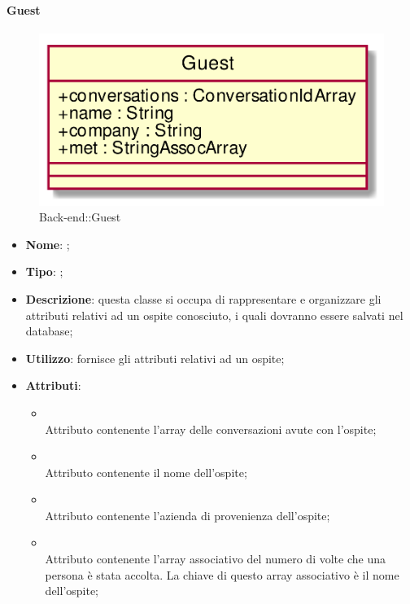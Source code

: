 \hypertarget{Guest_label}{\paragraph{Guest}}
\begin{figure}[h]
	\centering
	\includegraphics[width=\textwidth,height=\textheight,keepaspectratio]{images/ClassGuest.png}
	\caption{Back-end::Guest}
\end{figure}
\begin{itemize}
	\item \textbf{Nome}: ;
	\item \textbf{Tipo}: ;
	\item \textbf{Descrizione}: questa classe si occupa di rappresentare e organizzare gli attributi relativi ad un ospite conosciuto, i quali dovranno essere salvati nel database;
	\item \textbf{Utilizzo}: fornisce gli attributi relativi ad un ospite;
	\item \textbf{Attributi}:
	\begin{itemize}
		\item[]  \\
		Attributo contenente l'array delle conversazioni avute con l'ospite;
		\item[]  \\
		Attributo contenente il nome dell'ospite;
		\item[]  \\
		Attributo contenente l'azienda di provenienza dell'ospite;
		\item[]  \\
		Attributo contenente l'array associativo del numero di volte che una persona è stata accolta. La chiave di questo array associativo è il nome dell'ospite;
	\end{itemize}
\end{itemize}
\FloatBarrier

